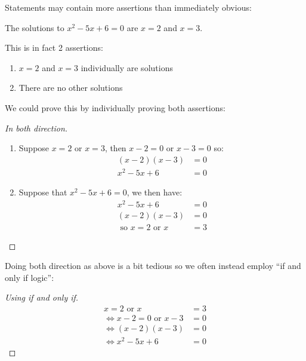 \documentclass[../main.tex]{subfiles}
\begin{document}
Statements may contain more assertions than immediately obvious:
\begin{proposition}
  The solutions to $x^2 - 5x + 6 = 0$ are $x = 2$ and $x = 3$.
\end{proposition}
This is in fact 2 assertions:
\begin{enumerate}
  \item $x = 2$ and $x = 3$ individually are solutions
  \item There are no other solutions
\end{enumerate}
We could prove this by individually proving both assertions:
\begin{proof}[In both direction]
  \begin{enumerate}
    \item Suppose $x = 2$ or $x = 3$, then $x - 2 = 0$ or $x - 3 = 0$ so:
      \begin{align*}
        (x-2)(x-3) &= 0 \\
        x^2 - 5x + 6 &= 0
      \end{align*}
    \item Suppose that $x^2 - 5x + 6 = 0$, we then have:
      \begin{align*}
        x^2 - 5x + 6 &= 0 \\
        (x - 2)(x - 3) &= 0 \\
        \text{ so } x = 2 \text{ or } x &= 3
      \end{align*}
  \end{enumerate}
\end{proof}
Doing both direction as above is a bit tedious so we often instead employ ``if and only if logic'':
\begin{proof}[Using if and only if]
  \begin{align*}
    x = 2 \text{ or } x &= 3 \\
    \iff x - 2 = 0 \text{ or } x - 3 &= 0 \\
    \iff (x - 2)(x - 3) &= 0 \\
    \iff x^2 - 5x + 6 &= 0
  \end{align*}
\end{proof}
\end{document}

